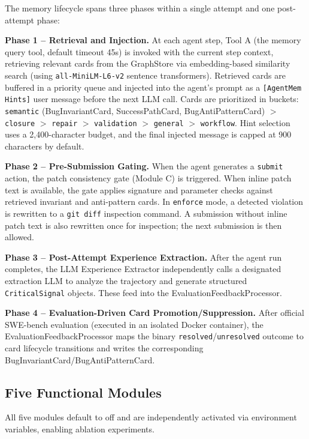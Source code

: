 \documentclass[runningheads]{llncs}
\begin{document}
The memory lifecycle spans three phases within a single attempt and one post-attempt phase:

\textbf{Phase 1 -- Retrieval and Injection.} At each agent step, Tool A (the memory query tool, default timeout 45s) is invoked with the current step context, retrieving relevant cards from the GraphStore via embedding-based similarity search (using \texttt{all-MiniLM-L6-v2} sentence transformers). Retrieved cards are buffered in a priority queue and injected into the agent's prompt as a \texttt{[AgentMem Hints]} user message before the next LLM call. Cards are prioritized in buckets: \texttt{semantic} (BugInvariantCard, SuccessPathCard, BugAntiPatternCard) $>$ \texttt{closure} $>$ \texttt{repair} $>$ \texttt{validation} $>$ \texttt{general} $>$ \texttt{workflow}. Hint selection uses a 2,400-character budget, and the final injected message is capped at 900 characters by default.

\textbf{Phase 2 -- Pre-Submission Gating.} When the agent generates a \texttt{submit} action, the patch consistency gate (Module C) is triggered. When inline patch text is available, the gate applies signature and parameter checks against retrieved invariant and anti-pattern cards. In \texttt{enforce} mode, a detected violation is rewritten to a \texttt{git diff} inspection command. A submission without inline patch text is also rewritten once for inspection; the next submission is then allowed.

\textbf{Phase 3 -- Post-Attempt Experience Extraction.} After the agent run completes, the LLM Experience Extractor independently calls a designated extraction LLM to analyze the trajectory and generate structured \texttt{CriticalSignal} objects. These feed into the EvaluationFeedbackProcessor.

\textbf{Phase 4 -- Evaluation-Driven Card Promotion/Suppression.} After official SWE-bench evaluation (executed in an isolated Docker container), the EvaluationFeedbackProcessor maps the binary \texttt{resolved}/\texttt{unresolved} outcome to card lifecycle transitions and writes the corresponding BugInvariantCard/BugAntiPatternCard.

\subsection{Five Functional Modules}

All five modules default to off and are independently activated via environment variables, enabling ablation experiments.
\end{document}
